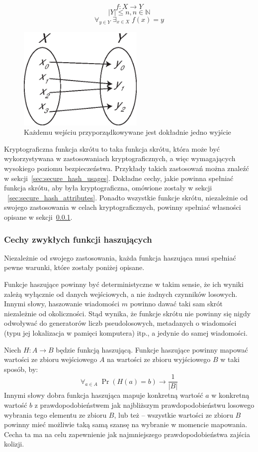 \documentclass[12pt,a4paper,twoside]{article}
\begin{document}
$$ f \colon X \to Y $$
$$ |Y| \leq n, n \in \mathbb{N} $$
$$ \forall_{y \in Y} \; \exists_{x \in X} \; f(x)=y $$

\begin{figure}[htb!]
\includegraphics[width=6cm]{img/surjection.eps}
\caption{Każdemu wejściu przyporządkowywane jest dokładnie jedno wyjście}
\label{fig:surjection}
\end{figure}

Kryptograficzna funkcja skrótu to taka funkcja skrótu, która może być
wykorzystywana w zastosowaniach kryptograficznych, a więc wymagających
wysokiego poziomu bezpieczeństwa. Przykłady takich zastosowań można znaleźć w
sekcji~\ref{sec:secure_hash_usages}. Dokładne cechy, jakie powinna spełniać
funkcja skrótu, aby była kryptograficzna, omówione zostały w sekcji
~\ref{sec:secure_hash_attributes}. Ponadto wszystkie funkcje skrótu,
niezależnie od swojego zastosowania w celach kryptograficznych, powinny
spełniać własności opisane w sekcji~\ref{sec:common_hash_attributes}.



\subsubsection{Cechy zwykłych funkcji haszujących}
\label{sec:common_hash_attributes}
Niezależnie od swojego zastosowania, każda funkcja haszująca musi spełniać
pewne warunki, które zostały poniżej opisane.

Funkcje haszujące powinny być deterministyczne w takim sensie, że ich wyniki
zależą wyłącznie od danych wejściowych, a nie żadnych czynników losowych.
Innymi słowy, haszowanie wiadomości $m$ powinno dawać taki sam skrót
niezależnie od okoliczności. Stąd wynika, że funkcje skrótu nie powinny się
nigdy odwoływać do generatorów liczb pseudolosowych, metadanych o wiadomości
(typu jej lokalizacja w pamięci komputera) itp., a jedynie do samej wiadomości.

Niech $H : A \to B$ będzie funkcją haszującą. Funkcje haszujące powinny mapować
wartości ze zbioru wejściowego $A$ na wartości ze zbioru wyjściowego $B$ w taki
sposób, by:
\[
    \forall_{a \in A} \; \Pr(H(a) = b) \to \frac{1}{|B|}
\]
Innymi słowy dobra funkcja haszująca mapuje konkretną wartość $a$ w konkretną
wartość $b$ z prawdopodobieństwem jak najbliższym prawdopodobieństwu losowego
wybrania tego elementu ze zbioru $B$, lub też -- wszystkie wartości ze zbioru
$B$ powinny mieć możliwie taką samą szansę na wybranie w momencie mapowania.
Cecha ta ma na celu zapewnienie jak najmniejszego prawdopodobieństwa zajścia
kolizji.
\end{document}
